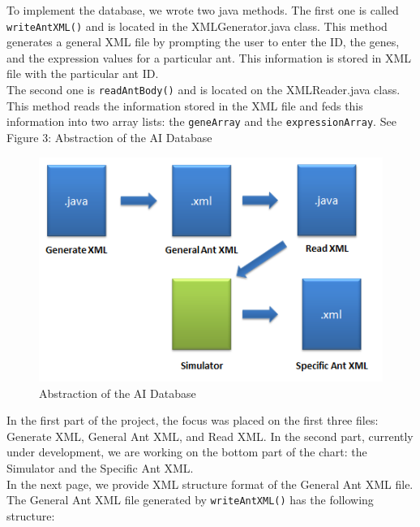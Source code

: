 \documentclass[titlepage, 12pt]{article}
\begin{document}
To implement the database, we wrote two java methods. The first one is called {\tt writeAntXML()} and is located in the XMLGenerator.java class. This method generates a general XML file by prompting the user to enter the ID, the genes, and the expression values for a particular ant. This information is stored in XML file with the particular ant ID. \\

The second one is {\tt readAntBody()} and is located on the XMLReader.java class. This method reads the information stored in the XML file and feds this information into two array lists: the {\tt geneArray} and the {\tt expressionArray}. See Figure 3: Abstraction of the AI Database\\

\newpage

\begin{figure}[h!]
    \centering
    \includegraphics{flowchart.png}
    \caption{Abstraction of the AI Database}
\end{figure}

In the first part of the project, the focus was placed on the first three files: Generate XML, General Ant XML, and Read XML. In the second part, currently under development, we are working on the bottom part of the chart: the Simulator and the Specific Ant XML.\\

In the next page, we provide XML structure format of the General Ant XML file. The General Ant XML file generated by {\tt writeAntXML()} has the following structure: \\
\end{document}
